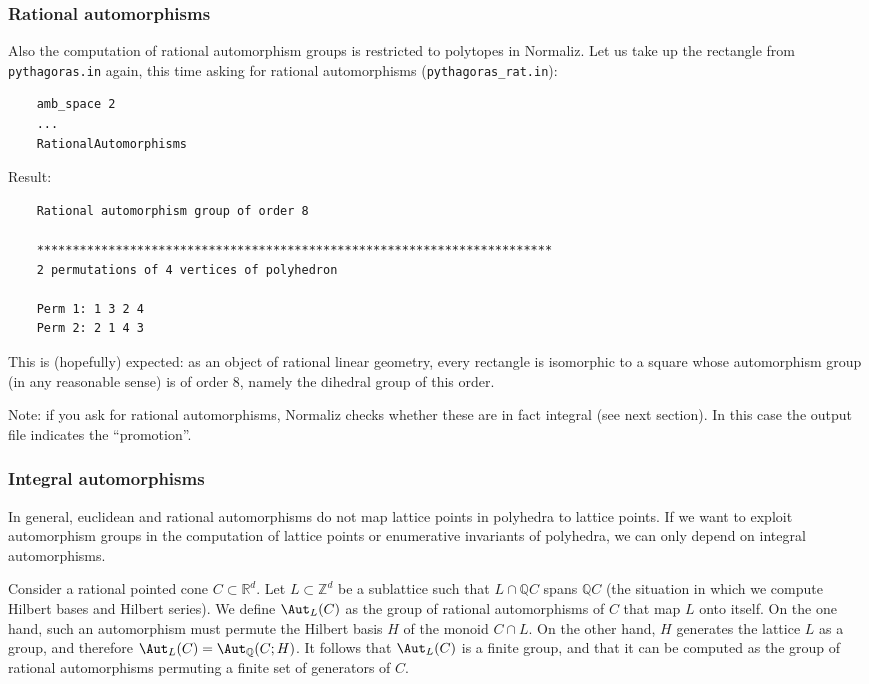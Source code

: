 \documentclass[12pt,a4paper]{scrartcl}
\theoremstyle{definition}
\def\ZZ{{\mathbb Z}}
\def\QQ{{\mathbb Q}}
\def\RR{{\mathbb R}}
\begin{document}
{	
	\subsubsection{Rational automorphisms}
	
	Also the computation of rational automorphism groups is restricted to polytopes in Normaliz. Let us take up the rectangle from \verb|pythagoras.in| again, this time asking for rational automorphisms (\verb|pythagoras_rat.in|):
	\begin{Verbatim}
	amb_space 2
	...
	RationalAutomorphisms
	\end{Verbatim}
	
	Result:
	\begin{Verbatim}
	Rational automorphism group of order 8
	
	************************************************************************
	2 permutations of 4 vertices of polyhedron
	
	Perm 1: 1 3 2 4
	Perm 2: 2 1 4 3
	\end{Verbatim}
	This is (hopefully) expected: as an object of rational linear geometry, every rectangle is isomorphic to a square whose automorphism group (in any reasonable sense) is of order $8$, namely the dihedral group of this order.
	
	Note: if you ask for rational automorphisms, Normaliz checks whether these are in fact integral (see next section). In this case the output file indicates the ``promotion''.
	
	\subsubsection{Integral automorphisms}
	
	In general, euclidean and rational automorphisms do not map lattice points in polyhedra to lattice points. If we want to exploit automorphism groups in the computation of lattice points or enumerative invariants of polyhedra, we can only depend on integral automorphisms.
	
	Consider a rational pointed cone $C\subset\RR^d$. Let $L\subset\ZZ^d$ be a sublattice such that $L\cap \QQ C$ spans $\QQ C$ (the situation in which we compute Hilbert bases and Hilbert series). We define $\Aut_L(C)$ as the group of rational automorphisms of $C$ that map $L$ onto itself. On the one hand,  such an automorphism must permute the Hilbert basis $H$ of the monoid $C\cap L$. On the other hand, $H$ generates the lattice $L$ as a group, and therefore $\Aut_L(C)=\Aut_\QQ(C;H)$. It follows that $\Aut_L(C)$ is a finite group, and that it can be computed as the group of rational automorphisms permuting a finite set of generators of $C$.
	
}
\end{document}
